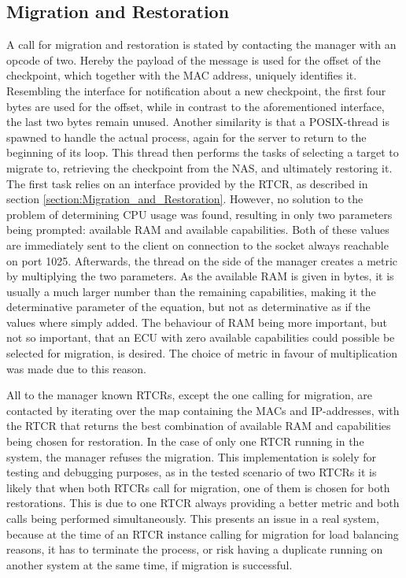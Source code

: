 \subsection{Migration and Restoration}
A call for migration and restoration is stated by contacting the manager with an opcode of two. Hereby the payload of the message is used for the offset of the checkpoint, which together with the MAC address, uniquely identifies it. Resembling the interface for notification about a new checkpoint, the first four bytes are used for the offset, while in contrast to the aforementioned interface, the last two bytes remain unused. Another similarity is that a POSIX-thread is spawned to handle the actual process, again for the server to return to the beginning of its loop. This thread then performs the tasks of selecting a target to migrate to, retrieving the checkpoint from the NAS, and ultimately restoring it. The first task relies on an interface provided by the RTCR, as described in section \ref{section:Migration_and_Restoration}. However, no solution to the problem of determining CPU usage was found, resulting in only two parameters being prompted: available RAM and available capabilities. Both of these values are immediately sent to the client on connection to the socket always reachable on port 1025. Afterwards, the thread on the side of the manager creates a metric by multiplying the two parameters. As the available RAM is given in bytes, it is usually a much larger number than the remaining capabilities, making it the determinative parameter of the equation, but not as determinative as if the values where simply added. The behaviour of RAM being more important, but not so important, that an ECU with zero available capabilities could possible be selected for migration, is desired. The choice of metric in favour of multiplication was made due to this reason.

All to the manager known RTCRs, except the one calling for migration, are contacted by iterating over the map containing the MACs and IP-addresses, with the RTCR that returns the best combination of available RAM and capabilities being chosen for restoration. In the case of only one RTCR running in the system, the manager refuses the migration. This implementation is solely for testing and debugging purposes, as in the tested scenario of two RTCRs it is likely that when both RTCRs call for migration, one of them is chosen for both restorations. This is due to one RTCR always providing a better metric and both calls being performed simultaneously. This presents an issue in a real system, because at the time of an RTCR instance calling for migration for load balancing reasons, it has to terminate the process, or risk having a duplicate running on another system at the same time, if migration is successful. 

